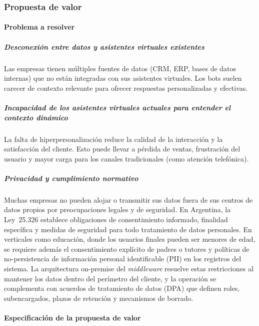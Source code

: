 \subsubsection{Propuesta de valor}

\paragraph{Problema a resolver}

\subparagraph{Desconexión entre datos y asistentes virtuales existentes}
Las empresas tienen múltiples fuentes de datos (CRM, ERP, bases de datos internas) que no están integradas con sus asistentes virtuales. Los bots suelen carecer de contexto relevante para ofrecer respuestas personalizadas y efectivas.

\subparagraph{Incapacidad de los asistentes virtuales actuales para entender el contexto dinámico}
La falta de hiperpersonalización reduce la calidad de la interacción y la satisfacción del cliente. Esto puede llevar a pérdida de ventas, frustración del usuario y mayor carga para los canales tradicionales (como atención telefónica).

\subparagraph{Privacidad y cumplimiento normativo}
Muchas empresas no pueden alojar o transmitir sus datos fuera de sus centros de datos propios por preocupaciones legales y de seguridad. En Argentina, la Ley~25.326 establece obligaciones de consentimiento informado, finalidad específica y medidas de seguridad para todo tratamiento de datos personales. En verticales como educación, donde los usuarios finales pueden ser menores de edad, se requiere además el consentimiento explícito de padres o tutores y políticas de no-persistencia de información personal identificable (PII) en los registros del sistema. La arquitectura on-premise del \textit{middleware} resuelve estas restricciones al mantener los datos dentro del perímetro del cliente, y la operación se complementa con acuerdos de tratamiento de datos (DPA) que definen roles, subencargados, plazos de retención y mecanismos de borrado.

\paragraph{Especificación de la propuesta de valor}

